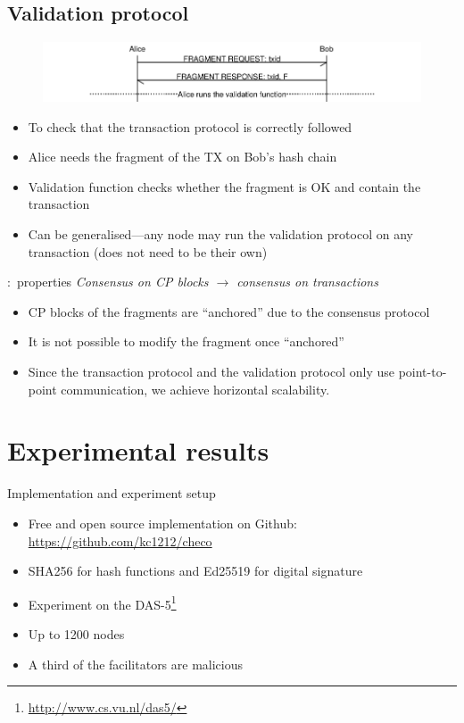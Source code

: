 \documentclass{beamer}
\begin{document}
\subsection{Validation protocol}
\begin{frame}{\subsecname}
  \begin{figure}[h]
  \includegraphics[width=1.0\textwidth]{vd-proto}
  \centering
  \end{figure}
\begin{itemize}
\item To check that the transaction protocol is correctly followed
\item Alice needs the fragment of the TX on Bob's hash chain 
\item Validation function checks whether the fragment is OK and contain the transaction
\item Can be generalised---any node may run the validation protocol on any transaction (does not need to be their own)
\end{itemize}
\end{frame}

\begin{frame}{\subsecname:~properties}
\emph{Consensus on CP blocks $\rightarrow$ consensus on transactions}
\bigskip
\begin{itemize}
  \item CP blocks of the fragments are ``anchored'' due to the consensus protocol
  \item It is not possible to modify the fragment once ``anchored''
  \item Since the transaction protocol and the validation protocol only use point-to-point communication,
  we achieve horizontal scalability.
\end{itemize}
\end{frame}

\section{Experimental results}
\begin{frame}{Implementation and experiment setup}
  \begin{itemize}
    \item Free and open source implementation on Github:
      \url{https://github.com/kc1212/checo}
    \item SHA256 for hash functions and Ed25519 for digital signature
    \item Experiment on the DAS-5\footnote{\url{http://www.cs.vu.nl/das5/}}
    \item Up to 1200 nodes
    \item A third of the facilitators are malicious
  \end{itemize}
\end{frame}
\end{document}
